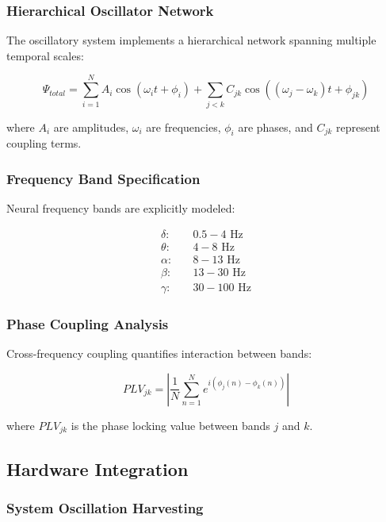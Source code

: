 \documentclass[12pt,a4paper]{article}
\begin{document}
\subsubsection{Hierarchical Oscillator Network}

The oscillatory system implements a hierarchical network spanning multiple temporal scales:

\begin{equation}
\Psi_{total} = \sum_{i=1}^N A_i \cos(\omega_i t + \phi_i) + \sum_{j<k} C_{jk} \cos((\omega_j - \omega_k)t + \phi_{jk})
\end{equation}

where $A_i$ are amplitudes, $\omega_i$ are frequencies, $\phi_i$ are phases, and $C_{jk}$ represent coupling terms.

\subsubsection{Frequency Band Specification}

Neural frequency bands are explicitly modeled:

\begin{align}
\delta: &\quad 0.5 - 4 \text{ Hz} \\
\theta: &\quad 4 - 8 \text{ Hz} \\
\alpha: &\quad 8 - 13 \text{ Hz} \\
\beta: &\quad 13 - 30 \text{ Hz} \\
\gamma: &\quad 30 - 100 \text{ Hz}
\end{align}

\subsubsection{Phase Coupling Analysis}

Cross-frequency coupling quantifies interaction between bands:

\begin{equation}
PLV_{jk} = \left|\frac{1}{N}\sum_{n=1}^N e^{i(\phi_j(n) - \phi_k(n))}\right|
\end{equation}

where $PLV_{jk}$ is the phase locking value between bands $j$ and $k$.

\subsection{Hardware Integration}

\subsubsection{System Oscillation Harvesting}
\end{document}

